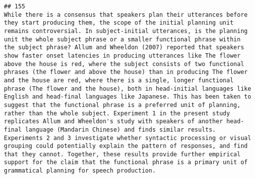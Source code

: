 \documentclass[
  english,
  man]{apa6}
\begin{document}
\begin{verbatim}
## 155                                                                                                                                                                                                                                                                                                                                                                                                                                                                                                                                                                                                                                                                                                                                                                                                                                                                                                                                                                                                                                                                                                                                                                                                                                                                           While there is a consensus that speakers plan their utterances before they start producing them, the scope of the initial planning unit remains controversial. In subject-initial utterances, is the planning unit the whole subject phrase or a smaller functional phrase within the subject phrase? Allum and Wheeldon (2007) reported that speakers show faster onset latencies in producing utterances like The flower above the house is red, where the subject consists of two functional phrases (the flower and above the house) than in producing The flower and the house are red, where there is a single, longer functional phrase (The flower and the house), both in head-initial languages like English and head-final languages like Japanese. This has been taken to suggest that the functional phrase is a preferred unit of planning, rather than the whole subject. Experiment 1 in the present study replicates Allum and Wheeldon's study with speakers of another head-final language (Mandarin Chinese) and finds similar results. Experiments 2 and 3 investigate whether syntactic processing or visual grouping could potentially explain the pattern of responses, and find that they cannot. Together, these results provide further empirical support for the claim that the functional phrase is a primary unit of grammatical planning for speech production.

\end{verbatim}
\end{document}
